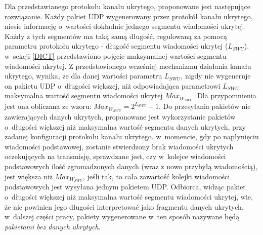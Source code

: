 \documentclass[a4paper, twoside, 12pt]{report}
\begin{document}
    Dla przedstawianego protokołu kanału ukrytego, proponowane jest następujące
    rozwiązanie. Każdy pakiet UDP wygenerowany przez protokół kanału ukrytego,
    niesie informację o~wartości dokładnie jednego segmentu wiadomości ukrytej.
    Każdy z tych segmentów ma taką samą długość, regulowaną za pomocą parametru
    protokołu ukrytego - długość segmentu wiadomości ukrytej (\( L_{SWU} \)). w~sekcji \ref{DICT}
    przedstawiono pojęcie maksymalnej wartości segmentu wiadomości ukrytej.
    Z przedstawionego wcześniej mechanizmu
    działania kanału ukrytego, wynika, że dla danej wartości parametru \( L_{SWU} \),
    nigdy nie wygeneruje on pakietu UDP o~długości większej, niż odpowiadająca parametrowi
    \( L_{SWU} \) maksymalna wartość segmentu wiadomości ukrytej \( Max_{W_{SWU}} \).
    Dla przypomnienia jest ona obliczana ze wzoru:
    \begin{math}
        Max_{W_{SWU}} = 2^{L_{SWU}} - 1
    \end{math}.
    Do przesyłania pakietów nie zawierających danych ukrytych, proponowane jest
    wykorzystanie pakietów o~długości większej niż maksymalna wartość segmentu
    danych ukrytych, przy zadanej konfiguracji protokołu kanału ukrytego. w~momencie,
    gdy po napłynięciu wiadomości podstawowej, zostanie stwierdzony brak wiadomości
    ukrytych oczekujących na transmisję, sprawdzane jest, czy w~kolejce wiadomości
    podstawowych ilość zgromadzonych danych (wraz z nowo przybyłą wiadomością), jest
    większa niż \( Max_{W_{SWU}} \), jeśli tak, to cała zawartość kolejki wiadomości
    podstawowych jest wysyłana jednym pakietem UDP. Odbiorca, widząc pakiet o~długości
    większej niż maksymalna wartość segmentu wiadomości ukrytej, wie, że nie powinien
    jego długości interpretować jako fragmentu danych ukrytych. w~dalszej części
    pracy, pakiety wygenerowane w~ten sposób nazywane będą \emph{pakietami bez danych ukrytych}.
\end{document}
